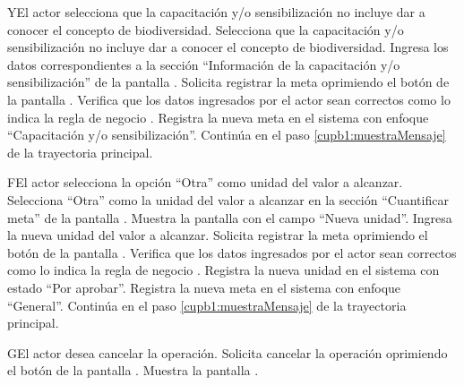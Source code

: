 \begin{UCtrayectoriaA}{Y}{El actor selecciona que la capacitación y/o sensibilización no incluye dar a conocer el concepto de biodiversidad.}
	\UCpaso[\UCactor] Selecciona que la capacitación y/o sensibilización no incluye dar a conocer el concepto de biodiversidad.
	\UCpaso[\UCactor] Ingresa los datos correspondientes a la sección ``Información de la capacitación y/o sensibilización'' de la pantalla .
	\UCpaso[\UCactor] Solicita registrar la meta oprimiendo el botón  de la pantalla .  
	\UCpaso[\UCsist] Verifica que los datos ingresados por el actor sean correctos como lo indica la regla de negocio .   
	\UCpaso[\UCsist] Registra la nueva meta en el sistema con enfoque ``Capacitación y/o sensibilización''.
	\UCpaso[] Continúa en el paso \ref{cupb1:muestraMensaje} de la trayectoria principal.
\end{UCtrayectoriaA}

\begin{UCtrayectoriaA}{F}{El actor selecciona la opción ``Otra'' como unidad del valor a alcanzar.}
	\UCpaso[\UCactor] Selecciona ``Otra'' como la unidad del valor a alcanzar en la sección ``Cuantificar meta'' de la pantalla .
	\UCpaso[\UCsist] Muestra la pantalla   con el campo ``Nueva unidad''.
	\UCpaso[\UCactor] Ingresa la nueva unidad del valor a alcanzar.
	\UCpaso[\UCactor] Solicita registrar la meta oprimiendo el botón  de la pantalla .  
	\UCpaso[\UCsist] Verifica que los datos ingresados por el actor sean correctos como lo indica la regla de negocio .   
	\UCpaso[\UCsist] Registra la nueva unidad en el sistema con estado ``Por aprobar''.
	\UCpaso[\UCsist] Registra la nueva meta en el sistema con enfoque ``General''.
	\UCpaso[] Continúa en el paso \ref{cupb1:muestraMensaje} de la trayectoria principal.
\end{UCtrayectoriaA} 

\begin{UCtrayectoriaA}{G}{El actor desea cancelar la operación.}
	\UCpaso[\UCactor] Solicita cancelar la operación oprimiendo el botón  de la pantalla .
	\UCpaso[\UCsist] Muestra la pantalla  .
\end{UCtrayectoriaA} 

